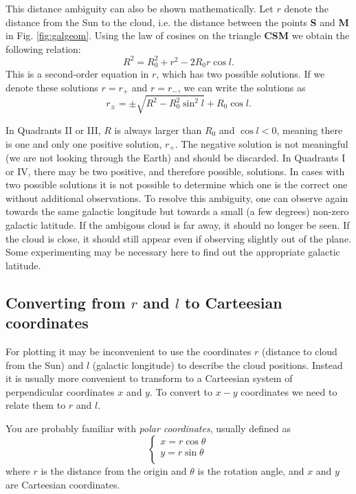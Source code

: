 This distance ambiguity can also be shown mathematically. Let $r$ denote the
distance from the Sun to the cloud, i.e. the distance between the points {\bf
S} and {\bf M} in  Fig.  \ref{fig:galgeom}. Using the law of cosines on the triangle
{\bf CSM} we obtain the following relation:
\begin{equation}
R^2 = R_0^2 + r^2 - 2 R_0 r \cos l.
\end{equation}
This is a second-order equation in $r$, which has two possible solutions. If we
denote these solutions $r=r_{+}$ and $r=r_{-}$, we can write the solutions as
\begin{equation}
\boxed{
r_\pm = \pm \sqrt{R^2 - R_0^2 \sin^2 l} + R_0\cos l .
}
\label{eqn:rpm}
\end{equation}

In Quadrants II or III, $R$ is always larger than $R_0$ and $\cos l <0$,
meaning there is one and only one positive solution, $r_+$. The negative
solution is not meaningful (we are not looking through the Earth) and should be
discarded. In Quadrants I or IV, there may be two positive, and therefore
possible, solutions. In cases with two possible solutions it is not possible to
determine which one is the correct one without additional observations.  To
resolve this ambiguity, one can observe again towards the same galactic
longitude but towards a small (a few degrees) non-zero galactic latitude.  If
the ambigous cloud is far away, it should no longer be seen. If the cloud is
close, it should still appear even if observing slightly out of the plane. 
Some experimenting may be necessary here to find out the appropriate
galactic latitude.

\subsection{Converting from $r$ and $l$ to Carteesian coordinates} 
For plotting it may be inconvenient to use the coordinates $r$ (distance to
cloud from the Sun) and $l$ (galactic longitude) to describe the cloud
positions. Instead it is usually more convenient to transform to a Carteesian
system of perpendicular coordinates $x$ and $y$.  To convert to $x-y$
coordinates we need to relate them to $r$ and $l$.  

You are probably familiar with \emph{polar coordinates}, usually defined as
\begin{equation}
\left\{ 
\begin{array}{l}
x=r \cos \theta \\
y=r \sin \theta \\
\end{array}
\right.
\label{eqn:polar}
\end{equation} 
where $r$ is the distance from the origin and $\theta$ is the rotation angle, and 
$x$ and $y$ are Carteesian coordinates. 

